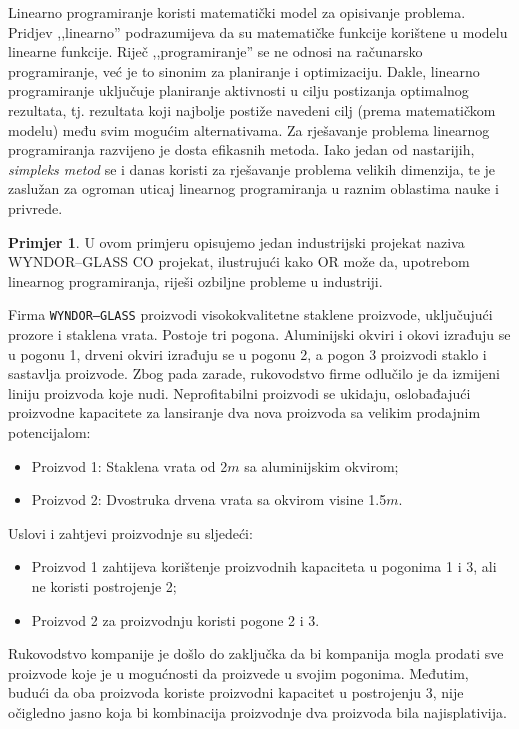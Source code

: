 \documentclass[b5paper, utf8, 11pt, colorlinks]{book}
\theoremstyle{definition}
\newtheorem{primjer}{Primjer}[chapter]
\begin{document}
Linearno programiranje koristi matematički model za opisivanje problema. Pridjev ,,linearno'' podrazumijeva da su  matematičke funkcije korištene u modelu linearne funkcije. Riječ ,,programiranje'' se ne odnosi na računarsko programiranje, već je to sinonim za planiranje i optimizaciju. Dakle, linearno programiranje uključuje planiranje aktivnosti u cilju postizanja optimalnog rezultata, tj. rezultata koji najbolje postiže navedeni cilj (prema matematičkom modelu) među svim mogućim alternativama.  Za rješavanje problema linearnog programiranja razvijeno je dosta efikasnih metoda. Iako jedan od nastarijih,  \emph{simpleks metod} se i danas koristi za rješavanje problema velikih dimenzija, te je zaslužan za ogroman uticaj linearnog  programiranja u raznim oblastima nauke i privrede.

 \begin{primjer}\label{primjer:graficki} U ovom primjeru opisujemo jedan industrijski projekat 
 naziva {WYNDOR--GLASS CO projekat}, ilustrujući kako OR  može da, upotrebom linearnog programiranja, riješi ozbiljne probleme u industriji.
  \end{primjer}
 Firma \texttt{WYNDOR--GLASS} proizvodi visokokvalitetne staklene proizvode, uključujući prozore i staklena vrata. Postoje tri pogona. Aluminijski okviri i okovi izrađuju se u pogonu 1, drveni okviri izrađuju se u pogonu 2, a pogon 3 proizvodi staklo i sastavlja proizvode.
 Zbog pada zarade, rukovodstvo firme   odlučilo je da izmijeni liniju proizvoda koje nudi. Neprofitabilni proizvodi se ukidaju, oslobađajući proizvodne kapacitete za lansiranje dva nova proizvoda sa velikim prodajnim potencijalom:
 \begin{itemize}
     \item Proizvod 1: Staklena vrata od 2$m$ sa aluminijskim okvirom;
     \item Proizvod 2: Dvostruka drvena vrata sa okvirom visine 1.5$m$.
 \end{itemize}
 Uslovi i zahtjevi proizvodnje su sljedeći:
 \begin{itemize}
     \item Proizvod 1 zahtijeva   korištenje proizvodnih kapaciteta u pogonima 1 i 3, ali ne koristi postrojenje 2; 
     \item Proizvod 2 za proizvodnju koristi  pogone 2 i 3. 
 \end{itemize}
    
     Rukovodstvo kompanije je došlo do zaključka da bi kompanija mogla prodati sve proizvode koje je u mogućnosti da proizvede u svojim pogonima. Međutim, budući da   oba proizvoda koriste proizvodni kapacitet u postrojenju 3, nije očigledno jasno koja bi kombinacija proizvodnje dva proizvoda bila najisplativija. %
\end{document}
